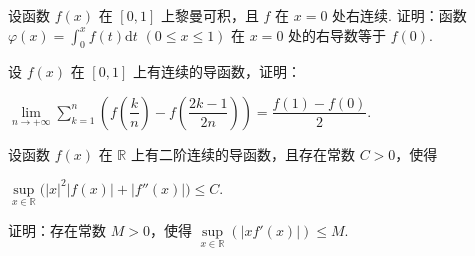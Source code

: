 \documentclass{exam}
\begin{document}
\begin{questions}
    \question[10]设函数 \(f(x)\) 在 \([0,1]\) 上黎曼可积，且 \(f\) 在 \(x=0\) 处右连续. 证明：函数 \(\varphi(x)=\displaystyle\int_{0}^{x}f(t)\mathrm{d}t\) \((0\leq x\leq1)\) 在 \(x=0\) 处的右导数等于 \(f(0)\).

    \question[10]设 \(f(x)\) 在 \([0,1]\) 上有连续的导函数，证明：

    \begin{center}
        \(\lim\limits_{n\to+\infty}\displaystyle\sum\limits_{k=1}^n\left(f(\dfrac{k}{n})-f(\dfrac{2k-1}{2n})\right)=\dfrac{f(1)-f(0)}{2}\).
    \end{center}

    \question[5]设函数 \(f(x)\) 在 \(\mathbb{R}\) 上有二阶连续的导函数，且存在常数 \(C>0\)，使得

    \begin{center}
        \(\sup\limits_{x\in\mathbb{R}}\Big(|x|^2|f(x)|+|f''(x)|\Big)\leq C\).
    \end{center}
    
    证明：存在常数 \(M>0\)，使得 \(\sup\limits_{x\in\mathbb{R}}(|xf'(x)|)\leq M\).

\end{questions}
\end{document}

